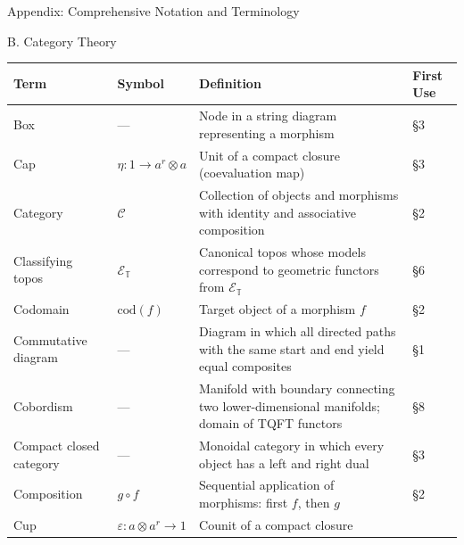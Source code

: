 \documentclass[
  ignorenonframetext,
]{beamer}
\newcounter{none} %
\begin{document}
\begin{frame}{Appendix: Comprehensive Notation and Terminology}
\begin{block}{B. Category Theory}
\protect{}\label{b.-category-theory}
{\def\LTcaptype{none} %
\begin{longtable}[]{@{}
  >{\raggedright\arraybackslash}p{}
  >{\centering\arraybackslash}p{}
  >{\raggedright\arraybackslash}p{}
  >{\centering\arraybackslash}p{}@{}}
\toprule\noalign{}
\begin{minipage}[b]{\linewidth}\raggedright
Term
\end{minipage} & \begin{minipage}[b]{\linewidth}\centering
Symbol
\end{minipage} & \begin{minipage}[b]{\linewidth}\raggedright
Definition
\end{minipage} & \begin{minipage}[b]{\linewidth}\centering
First Use
\end{minipage} \\
\midrule\noalign{}
\endhead
Box & --- & Node in a string diagram representing a morphism & §3 \\
Cap & \(\eta: 1 \to a^r \otimes a\) & Unit of a compact closure
(coevaluation map) & §3 \\
Category & \(\mathcal{C}\) & Collection of objects and morphisms with
identity and associative composition & §2 \\
Classifying topos & \(\mathcal{E}_{\mathbb{T}}\) & Canonical topos whose
models correspond to geometric functors from
\(\mathcal{E}_{\mathbb{T}}\) & §6 \\
Codomain & \(\text{cod}(f)\) & Target object of a morphism \(f\) & §2 \\
Commutative diagram & --- & Diagram in which all directed paths with the
same start and end yield equal composites & §1 \\
Cobordism & --- & Manifold with boundary connecting two
lower-dimensional manifolds; domain of TQFT functors & §8 \\
Compact closed category & --- & Monoidal category in which every object
has a left and right dual & §3 \\
Composition & \(g \circ f\) & Sequential application of morphisms: first
\(f\), then \(g\) & §2 \\
Cup & \(\varepsilon: a \otimes a^r \to 1\) & Counit of a compact closure

\end{longtable}}
\end{block}
\end{frame}
\end{document}
